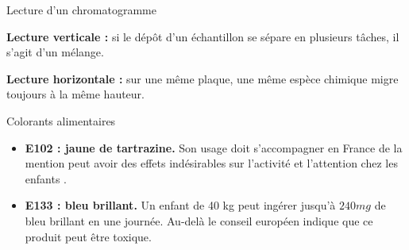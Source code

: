 \begin{doc}{Lecture d'un chromatogramme}
  \vspace*{-24pt}
  \begin{figure}
    \vspace*{-30pt}
    \centering
  \end{figure}
  
  \textbullet\hspace{2pt} \textbf{Lecture verticale :} si le dépôt d'un échantillon se sépare en plusieurs tâches, il s'agit d'un mélange.
  
  \textbullet\hspace{2pt} \textbf{Lecture horizontale :} sur une même plaque, une même espèce chimique migre toujours à la même hauteur.
 
  \vspace{20pt}
  \phantom{4}
\end{doc}

\begin{doc}{Colorants alimentaires}
  \vspace*{-18pt}
  \begin{itemize}[label=\textbullet]
    \item \textbf{E102 : jaune de tartrazine.} Son usage doit s'accompagner en France de la mention \og peut avoir des effets indésirables sur l'activité et l'attention chez les enfants \fg.
    \item \textbf{E133 : bleu brillant.} Un enfant de 40 kg peut ingérer jusqu'à $240\unit{mg}$ de bleu brillant en une journée. Au-delà le conseil européen indique que ce produit peut être toxique.
  \end{itemize}
\end{doc}

